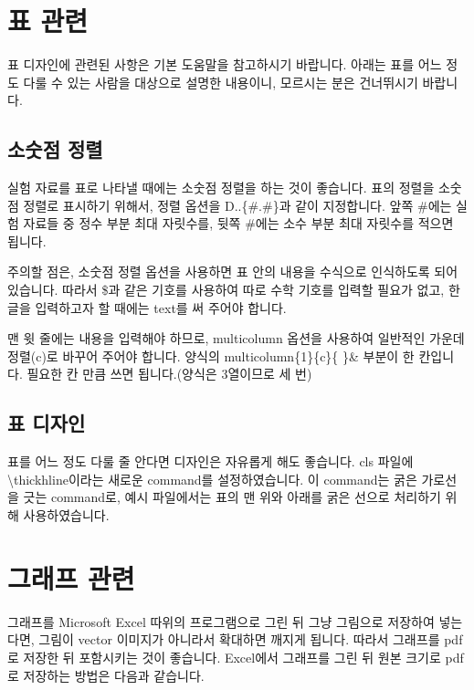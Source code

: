 \documentclass[a4paper,10pt]{article}
\begin{document}
	\section{표 관련}
	
	표 디자인에 관련된 사항은 기본 도움말을 참고하시기 바랍니다.
	아래는 표를 어느 정도 다룰 수 있는 사람을 대상으로
	설명한 내용이니, 모르시는 분은 건너뛰시기 바랍니다.
	
	\subsection{소숫점 정렬}
	실험 자료를 표로 나타낼 때에는 소숫점 정렬을 하는 것이 좋습니다.
	표의 정렬을 소숫점 정렬로 표시하기 위해서, 정렬 옵션을
	D..\{\#.\#\}과 같이 지정합니다.
	앞쪽 \#에는 실험 자료들 중 정수 부분 최대 자릿수를,
	뒷쪽 \#에는 소수 부분 최대 자릿수를 적으면 됩니다.
	
	주의할 점은, 소숫점 정렬 옵션을 사용하면 표 안의 내용을
	수식으로 인식하도록 되어 있습니다. 따라서 \$과 같은 기호를 사용하여
	따로 수학 기호를 입력할 필요가 없고, 한글을 입력하고자 할 때에는 
	text를 써 주어야 합니다.
	
	맨 윗 줄에는 내용을 입력해야 하므로, multicolumn 옵션을 사용하여
	일반적인 가운데 정렬(c)로 바꾸어 주어야 합니다.
	양식의 multicolumn\{1\}\{c\}\{ \}\& 부분이 한 칸입니다.
	필요한 칸 만큼 쓰면 됩니다.(양식은 3열이므로 세 번)
	
	\subsection{표 디자인}
	표를 어느 정도 다룰 줄 안다면 디자인은 자유롭게 해도 좋습니다.
	cls 파일에 \textbackslash thickhline이라는
	새로운 command를 설정하였습니다.
	이 command는 굵은 가로선을 긋는 command로,
	예시 파일에서는 표의 맨 위와 아래를 굵은 선으로
	처리하기 위해 사용하였습니다.
	
	\section{그래프 관련}
	그래프를 Microsoft Excel 따위의 프로그램으로 그린 뒤
	그냥 그림으로 저장하여 넣는다면, 그림이 vector 이미지가 아니라서
	확대하면 깨지게 됩니다.
	따라서 그래프를 pdf로 저장한 뒤 포함시키는 것이 좋습니다.
	Excel에서 그래프를 그린 뒤 원본 크기로 pdf로 저장하는 방법은
	다음과 같습니다.
	
\end{document}
